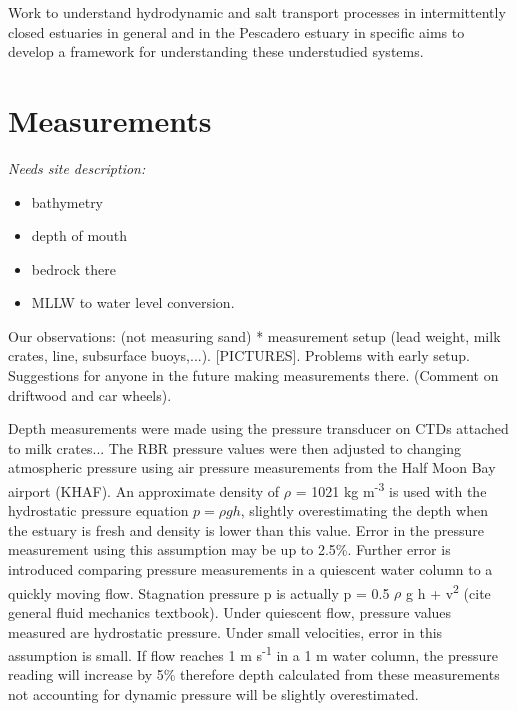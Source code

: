 Work to understand hydrodynamic and salt transport processes in intermittently closed estuaries in general and in the Pescadero estuary in specific aims to develop a framework for understanding these understudied systems. 

\section{Measurements} \label{measurementslabel}

\emph{Needs site description:}
\begin{itemize}
\item bathymetry \item depth of mouth \item bedrock there \item MLLW to water level
conversion. \end{itemize}

Our observations: (not measuring sand) * measurement setup (lead weight,
milk crates, line, subsurface buoys,...). [PICTURES]. Problems with
early setup. Suggestions for anyone in the future making measurements
there. (Comment on driftwood and car wheels).

Depth measurements were made using the pressure transducer on CTDs
attached to milk crates... The RBR pressure values were then adjusted to
changing atmospheric pressure using air pressure measurements from the
Half Moon Bay airport (KHAF). An approximate density of $\rho$ = 1021 kg
m\textsuperscript{-3} is used with the hydrostatic pressure equation ${p
= \rho g h}$, slightly overestimating the depth when the estuary is
fresh and density is lower than this value. Error in the pressure
measurement using this assumption may be up to 2.5\%. Further error is
introduced comparing pressure measurements in a quiescent water column
to a quickly moving flow. Stagnation pressure p is actually p = 0.5
$\rho$ g h +  v\textsuperscript{2} (cite general fluid mechanics
textbook). Under quiescent flow, pressure values measured are
hydrostatic pressure. Under small velocities, error in this assumption
is small. If flow reaches 1 m s\textsuperscript{-1} in a 1 m water
column, the pressure reading will increase by 5\% therefore depth
calculated from these measurements not accounting for dynamic pressure
will be slightly overestimated.

